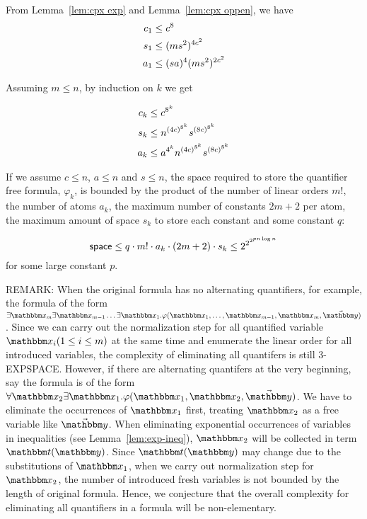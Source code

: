 From Lemma~\ref{lem:cpx exp} and Lemma~\ref{lem:cpx oppen}, we have
\begin{align}
    c_1&\le c^8 \notag \\
    s_1&\le (ms^2)^{4c^2} \notag\\
    a_1&\le (sa)^4(ms^2)^{2c^2}\notag 
\end{align} 

Assuming $m\le n$, by induction on $k$ we get

\begin{lemma}
    \begin{align}
        c_k&\le c^{8^k} \notag \\
        s_k&\le n^{(4c)^{ 8^k}} s^{(8c)^{ 8^k}} \notag\\
        a_k&\le a^{4^k}n^{(4c)^{ 8^k}} s^{(8c)^{ 8^k}} \notag
    \end{align} 
\end{lemma}

If we assume $c\le n$, $a\le n$ and $s\le n$, the space required to store the quantifier free formula, $\varphi_k$, is bounded by the product of the number of linear orders $m!$, the number of atoms $a_k$, the maximum number of constants $2m+2$ per atom, the maximum amount of space $s_k$ to store each constant and some constant $q$:
 
$${\sf space}\le q \cdot m! \cdot a_k \cdot (2m+2) \cdot s_k \le 2^{2^{2^{pn \log n}}}$$
for some large constant $p$. 

REMARK: When the original formula has no alternating quantifiers, for example, the formula of the form $\exists \ivarx_m \exists \ivarx_{m-1} \dots\exists \ivarx_1.\varphi(\ivarx_1,\dots,\ivarx_{m-1},\ivarx_m,\vec{\ivary})$. Since we can carry out the normalization step for all quantified variable $\ivarx_i(1\le i\le m)$ at the same time and enumerate the linear order for all introduced variables, the complexity of eliminating all quantifers is still 3-EXPSPACE. However, if there are  alternating quantifers at the very beginning, say the formula is of the form $\forall \ivarx_2\exists \ivarx_1.\varphi(\ivarx_1,\ivarx_2,\vec{\ivary})$. We have to eliminate the occurrences of $\ivarx_1$ first, treating $\ivarx_2$ as a free variable like $\vec{\ivary}$. When eliminating exponential occurrences of variables in inequalities (see Lemma~\ref{lem:exp-ineq}), $\ivarx_2$ will be collected in term $\iterm(\ivary)$. Since $\iterm(\ivary)$ may change due to the  substitutions of $\ivarx_1$, when we carry out normalization step for $\ivarx_2$, the number of introduced fresh variables is not bounded by the length of original formula. Hence, we conjecture that the overall complexity for eliminating all quantifiers in a formula will be non-elementary. 
